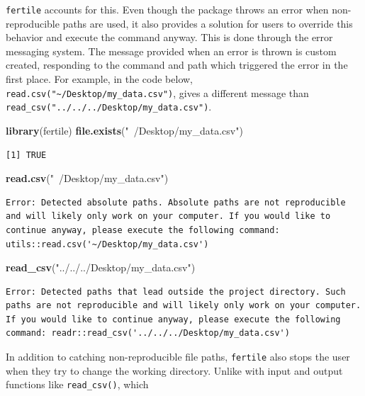 \documentclass[12pt,twoside]{reedthesis}
\newenvironment{Shaded}{\begin{snugshade}}{\end{snugshade}}
\newcommand{\KeywordTok}[1]{\textcolor[rgb]{0.13,0.29,0.53}{\textbf{#1}}}
\newcommand{\StringTok}[1]{\textcolor[rgb]{0.31,0.60,0.02}{#1}}
\newcommand{\NormalTok}[1]{#1}
\begin{document}
\texttt{fertile} accounts for this. Even though the package throws an
error when non-reproducible paths are used, it also provides a solution
for users to override this behavior and execute the command anyway. This
is done through the error messaging system. The message provided when an
error is thrown is custom created, responding to the command and path
which triggered the error in the first place. For example, in the code
below, \texttt{read.csv("\textasciitilde{}/Desktop/my\_data.csv")},
gives a different message than
\texttt{read\_csv("../../../Desktop/my\_data.csv")}.
\begin{Shaded}
\begin{Highlighting}[]
\KeywordTok{library}\NormalTok{(fertile)}
\KeywordTok{file.exists}\NormalTok{(}\StringTok{"~/Desktop/my_data.csv"}\NormalTok{)}
\end{Highlighting}
\end{Shaded}
\begin{verbatim}
[1] TRUE
\end{verbatim}
\begin{Shaded}
\begin{Highlighting}[]
\KeywordTok{read.csv}\NormalTok{(}\StringTok{"~/Desktop/my_data.csv"}\NormalTok{)}
\end{Highlighting}
\end{Shaded}
\begin{verbatim}
Error: Detected absolute paths. Absolute paths are not reproducible and will likely only work on your computer. If you would like to continue anyway, please execute the following command: utils::read.csv('~/Desktop/my_data.csv')
\end{verbatim}
\begin{Shaded}
\begin{Highlighting}[]
\KeywordTok{read_csv}\NormalTok{(}\StringTok{"../../../Desktop/my_data.csv"}\NormalTok{)}
\end{Highlighting}
\end{Shaded}
\begin{verbatim}
Error: Detected paths that lead outside the project directory. Such paths are not reproducible and will likely only work on your computer. If you would like to continue anyway, please execute the following command: readr::read_csv('../../../Desktop/my_data.csv')
\end{verbatim}
In addition to catching non-reproducible file paths, \texttt{fertile}
also stops the user when they try to change the working directory.
Unlike with input and output functions like \texttt{read\_csv()}, which
\end{document}
